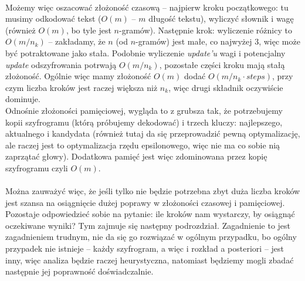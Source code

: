 \documentclass[a4paper]{article}
\begin{document}
\\
Możemy więc oszacować złożoność czasową – najpierw kroku początkowego: tu musimy odkodować tekst ($O(m)$ – $m$ długość tekstu), wyliczyć słownik i wagę (również  $O(m)$, bo tyle jest $n$-gramów). Następnie krok: wyliczenie różnicy to $O(m/n_k)$ – zakładamy, że $n$ (od $n$-gramów) jest małe, co najwyżej 3, więc może być potraktowane jako stała. Podobnie wyliczenie \textit{update'u} wagi i potencjalny \textit{update} odszyfrowania potrwają $O(m/n_k)$, pozostałe części kroku mają stałą złożoność. Ogólnie więc mamy złożoność $O(m)$ dodać $O(m/n_k \cdot steps)$, przy czym liczba kroków jest raczej większa niż $n_k$, więc drugi składnik oczywiście dominuje.\\
Odnośnie złożoności pamięciowej, wygląda to z grubsza tak, że potrzebujemy kopii szyfrogramu (którą próbujemy dekodować) i trzech kluczy: najlepszego, aktualnego i kandydata (również tutaj da się przeprowadzić pewną optymalizację, ale raczej jest to optymalizacja rzędu epsilonowego, więc nie ma co sobie nią zaprzątać głowy). Dodatkowa pamięć jest więc zdominowana przez kopię szyfrogramu czyli $O(m)$.\\\\
Można zauważyć więc, że jeśli tylko nie będzie potrzebna zbyt duża liczba kroków jest szansa na osiągnięcie dużej poprawy w złożoności czasowej i pamięciowej. Pozostaje odpowiedzieć sobie na pytanie: ile kroków nam wystarczy, by osiągnąć oczekiwane wyniki? Tym zajmuje się następny podrozdział. Zagadnienie to jest zagadnieniem trudnym, nie da się go rozwiązać w ogólnym przypadku, bo ogólny przypadek nie istnieje – każdy szyfrogram, a więc i rozkład a posteriori – jest inny, więc analiza będzie raczej heurystyczna, natomiast będziemy mogli zbadać następnie jej poprawność doświadczalnie.
\end{document}
